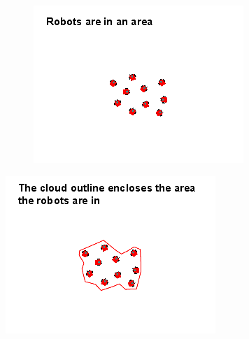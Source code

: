 \begin{figure}
	\centering
	\begin{subfigure}{0.3\textwidth}
		\includegraphics[width=\linewidth]{../ui_experiment/slide_images/Swarm_Robot_Control_-_Unknown_Number_of_Robots_0001.png}
	\end{subfigure}
		\includegraphics[width=\linewidth]{../ui_experiment/slide_images/Swarm_Robot_Control_-_Unknown_Number_of_Robots_0002.png}

\end{figure}
